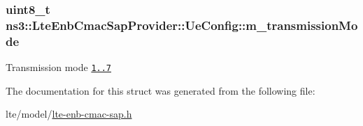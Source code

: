 \subsubsection[{\texorpdfstring{m\+\_\+transmission\+Mode}{m_transmissionMode}}]{\setlength{\rightskip}{0pt plus 5cm}uint8\+\_\+t ns3\+::\+Lte\+Enb\+Cmac\+Sap\+Provider\+::\+Ue\+Config\+::m\+\_\+transmission\+Mode}\hypertarget{structns3_1_1LteEnbCmacSapProvider_1_1UeConfig_acbdebc9d10dc9f315f5ca456ebd97b9d}{}\label{structns3_1_1LteEnbCmacSapProvider_1_1UeConfig_acbdebc9d10dc9f315f5ca456ebd97b9d}
Transmission mode \href{i.e., SISO, MIMO, etc.}{\tt 1..7} 

The documentation for this struct was generated from the following file\+:\begin{DoxyCompactItemize}
\item 
lte/model/\hyperlink{lte-enb-cmac-sap_8h}{lte-\/enb-\/cmac-\/sap.\+h}\end{DoxyCompactItemize}
